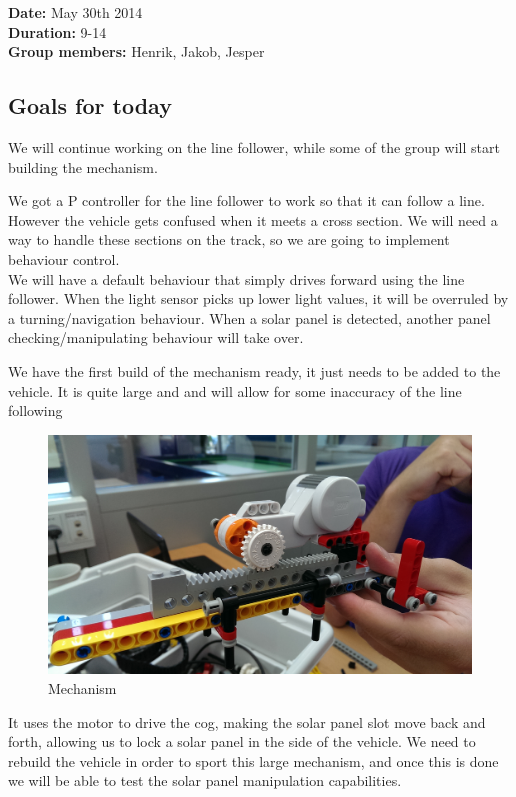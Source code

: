 \textbf{Date:} May 30th 2014\\\textbf{Duration:} 9-14\\\textbf{Group
members:} Henrik, Jakob, Jesper

\subsection{Goals for today}

We will continue working on the line follower, while some of the group
will start building the mechanism.

We got a P controller for the line follower to work so that it can
follow a line. However the vehicle gets confused when it meets a cross
section. We will need a way to handle these sections on the track, so
we are going to implement behaviour control.\\We will have a default behaviour
that simply drives forward using the line follower. When the light
sensor picks up lower light values, it will be overruled by a
turning/navigation behaviour. When a solar panel is detected, another
panel checking/manipulating behaviour will take over.

We have the first build of the mechanism ready, it just needs to be
added to the vehicle. It is quite large and and will allow for some
inaccuracy of the line following
\begin{figure}[hbt]
  \centering
  \includegraphics[scale=0.1]{../experiments/images/mekanisme.jpg}

\caption{Mechanism}
\end{figure}

It uses the motor to drive the cog, making the solar panel slot move
back and forth, allowing us to lock a solar panel in the side of the
vehicle. We need to rebuild the vehicle in order to sport this large
mechanism, and once this is done we will be able to test the solar panel
manipulation capabilities.

